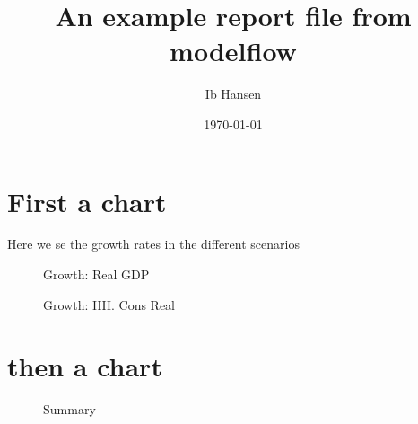 \documentclass{article}
\begin{document}
\title{An example report file from modelflow }
\author{Ib Hansen}
\date{\today} 

\maketitle
\tableofcontents
\newpage
\section{First a chart} 
Here we se the growth rates in the different scenarios

 
\begin{figure}[htbp]
\centering
\resizebox{\textwidth}{!}{}
\caption{Growth: Real GDP}
\end{figure}

 
\begin{figure}[htbp]
\centering
\resizebox{\textwidth}{!}{}
\caption{Growth: HH. Cons Real}
\end{figure}

\section{then a chart}
 
\begin{figure}[htbp]
\centering
\resizebox{\textwidth}{!}{}
\caption{Summary}
\end{figure}
\end{document}
